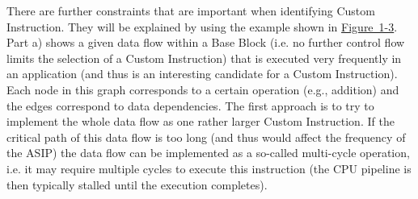 \documentclass[
]{article}
\begin{document}
There are further constraints that are important when identifying Custom
Instruction. They will be explained by using the example shown in
\protect\hyperlink{Fig13}{Figure~1-3}. Part a) shows a given data flow
within a Base Block (i.e. no further control flow limits the selection
of a Custom Instruction) that is executed very frequently in an
application (and thus is an interesting candidate for a Custom
Instruction). Each node in this graph corresponds to a certain operation
(e.g., addition) and the edges correspond to data dependencies. The
first approach is to try to implement the whole data flow as one rather
larger Custom Instruction. If the critical path of this data flow is too
long (and thus would affect the frequency of the ASIP) the data flow can
be implemented as a so-called multi-cycle operation, i.e. it may require
multiple cycles to execute this instruction (the CPU pipeline is then
typically stalled until the execution completes).
\end{document}
